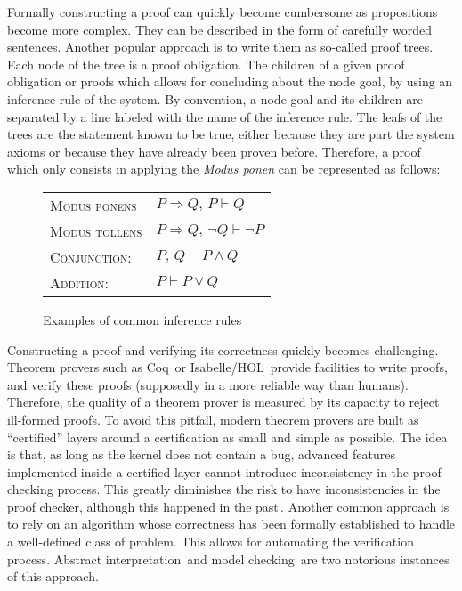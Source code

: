Formally constructing a proof can quickly become cumbersome as propositions
become more complex.
%
They can be described in the form of carefully worded sentences.
%
Another popular approach is to write them as so-called proof trees.
%
Each node of the tree is a proof obligation.
%
The children of a given proof obligation or proofs which allows for concluding
about the node goal, by using an inference rule of the system.
%
By convention, a node goal and its children are separated by a line labeled with
the name of the inference rule.
%
The leafs of the trees are the statement known to be true, either because they
are part the system axioms or because they have already been proven before.
%
Therefore, a proof which only consists in applying the \emph{Modus ponen} can be
represented as follows:
%
\begin{prooftree}
     
\end{prooftree}

\begin{figure}
  \begin{center}
    \begin{tabular}{ll}
      {\scshape Modus ponens} & \( P \Rightarrow Q\text{, }P \vdash Q \) \\
      {\scshape Modus tollens} &
                                 \( P \Rightarrow Q\text{, }\neg Q \vdash \neg P \) \\
      {\scshape Conjunction:} & \( P\text{, }Q \vdash P \wedge Q \) \\
      {\scshape Addition:} & \( P \vdash P \vee Q \)
    \end{tabular}
  \end{center}

  \caption{Examples of common inference rules}
  \label{fig:sota:inference}
\end{figure}

Constructing a proof and verifying its correctness quickly becomes challenging.
%
Theorem provers such as Coq\,\cite{coq} or Isabelle/HOL\,\cite{nipkow2002isabelle} provide
facilities to write proofs, and verify these proofs (supposedly in a more
reliable way than humans).
%
Therefore, the quality of a theorem prover is measured by its capacity to reject
ill-formed proofs.
%
To avoid this pitfall, modern theorem provers are built as ``certified'' layers
around a certification as small and simple as possible.
%
The idea is that, as long as the kernel does not contain a bug, advanced
features implemented inside a certified layer cannot introduce inconsistency in
the proof-checking process.
%
This greatly diminishes the risk to have inconsistencies in the proof checker,
although this happened in the
past\,\cite{claret2015falso,griffioen1998comparison}.
%
Another common approach is to rely on an algorithm whose correctness has been
formally established to handle a well-defined class of problem.
%
This allows for automating the verification process.
%
Abstract interpretation\,\cite{cousot1977absint} and model
checking\,\cite{clarke2018modelc} are two notorious instances of this approach.

